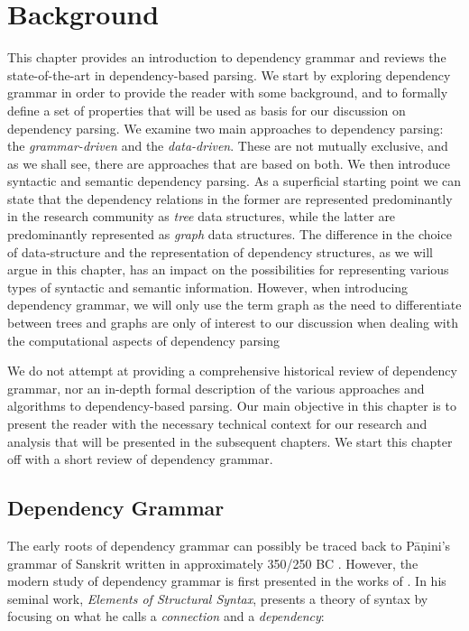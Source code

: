 \chapter{Background}
\label{chap:background}

This chapter provides an introduction to dependency grammar and reviews the state-of-the-art in dependency-based parsing. We start by exploring dependency grammar in order to provide the reader with some background, and to formally define a set of properties that will be used as basis for our discussion on dependency parsing. We examine two main approaches to dependency parsing: the \textit{grammar-driven} and the \textit{data-driven}. These are not mutually exclusive, and as we shall see, there are approaches that are based on both. We then introduce syntactic and semantic dependency parsing. As a superficial starting point we can state that the dependency relations in the former are represented predominantly in the research community as \textit{tree} data structures, while the latter are predominantly represented as \textit{graph} data structures. The difference in the choice of data-structure and the representation of dependency structures, as we will argue in this chapter, has an impact on the possibilities for representing various types of syntactic and semantic information. However, when introducing dependency grammar, we will only use the term graph as the need to differentiate between trees and graphs are only of interest to our discussion when dealing with the computational aspects of dependency parsing

We do not attempt at providing a comprehensive historical review of dependency grammar, nor an in-depth formal description of the various approaches and algorithms to dependency-based parsing. Our main objective in this chapter is to present the reader with the necessary technical context for our research and analysis that will be presented in the subsequent chapters. We start this chapter off with a short review of dependency grammar.

\section{Dependency Grammar}
\label{grammar}

The early roots of dependency grammar can possibly be traced back to P\={a}\d{n}ini's grammar of Sanskrit written in approximately 350/250 BC \cite{Kruijff:02}. However, the modern study of  dependency grammar is first presented in the works of \citeauthor{Tes:15}. In his seminal work, \textit{Elements of Structural Syntax}, \citeauthor{Tes:15} presents a theory of syntax by focusing on what he calls a \textit{connection} and a \textit{dependency}:

